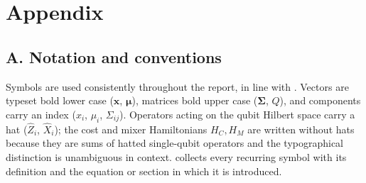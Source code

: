 \section{Appendix}
\label{section:appendix}

\subsection*{A. Notation and conventions}\label{subsec:app_notation}

Symbols are used consistently throughout the report, in line with \textcite{iso80000_2}. Vectors are typeset bold lower case ($\boldsymbol{x}$, $\boldsymbol\mu$), matrices bold upper case ($\boldsymbol\Sigma$, $Q$), and components carry an index ($x_i$, $\mu_i$, $\Sigma_{ij}$). Operators acting on the qubit Hilbert space carry a hat ($\hat{Z}_i$, $\hat{X}_i$); the cost and mixer Hamiltonians $H_C, H_M$ are written without hats because they are sums of hatted single-qubit operators and the typographical distinction is unambiguous in context.  collects every recurring symbol with its definition and the equation or section in which it is introduced.

